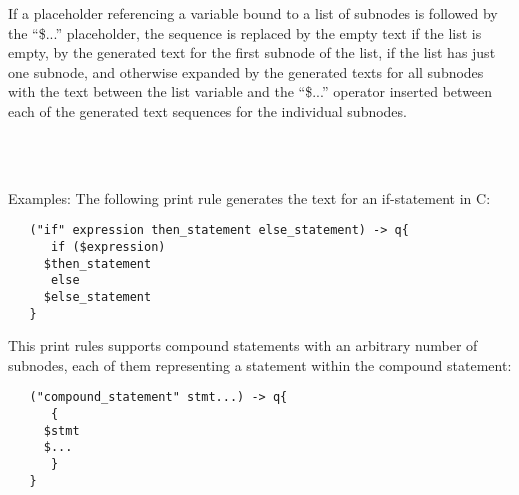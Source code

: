 If a placeholder referencing a variable bound to a list of 
subnodes is followed by the ``\$...'' placeholder, the
sequence is replaced by the empty text if the list is empty,
by the generated text for the first subnode of the list, if
the list has just one subnode, and otherwise expanded
by the generated texts for all subnodes with the text between
the list variable and the ``\$...'' operator inserted between
each of the generated text sequences for the individual subnodes.

\begin{grammar}
      \produces \lextoken{\$}  \\
      \produces \lextoken{\$}
	 \lextoken{\{}  \lextoken{\}} \\
      \produces {}
\end{grammar}

\noindent
Examples: The following print rule generates the text for an
if-statement in C:

\begin{lstlisting}
   ("if" expression then_statement else_statement) -> q{
      if ($expression)
	 $then_statement
      else
	 $else_statement
   }
\end{lstlisting}

\noindent
This print rules supports compound statements with an arbitrary
number of subnodes, each of them representing a statement within
the compound statement:

\begin{lstlisting}
   ("compound_statement" stmt...) -> q{
      {
	 $stmt
	 $...
      }
   }
\end{lstlisting}

\endinput
